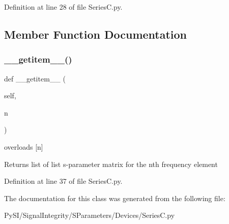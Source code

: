 Definition at line 28 of file Series\+C.\+py.



\subsection{Member Function Documentation}
\mbox{\label{classSignalIntegrity_1_1SParameters_1_1Devices_1_1SeriesC_1_1SeriesC_ab7a6da5139e0878b590d68292aaa70f2}} 
\subsubsection{\texorpdfstring{\+\_\+\+\_\+getitem\+\_\+\+\_\+()}{\_\_getitem\_\_()}}
{\footnotesize\ttfamily def \+\_\+\+\_\+getitem\+\_\+\+\_\+ (\begin{DoxyParamCaption}\item[{}]{self,  }\item[{}]{n }\end{DoxyParamCaption})}



overloads \mbox{[}n\mbox{]} 

\begin{DoxyReturn}{Returns}
list of list s-\/parameter matrix for the nth frequency element 
\end{DoxyReturn}


Definition at line 37 of file Series\+C.\+py.



The documentation for this class was generated from the following file\+:\begin{DoxyCompactItemize}
\item 
Py\+S\+I/\+Signal\+Integrity/\+S\+Parameters/\+Devices/Series\+C.\+py\end{DoxyCompactItemize}
